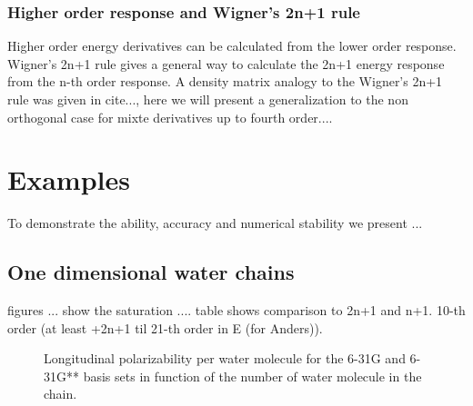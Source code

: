 \documentclass[twocolumn,showpacs,preprintnumbers,amsmath,amssymb]{revtex4}
\begin{document}
\subsubsection{Higher order response and Wigner's 2n+1 rule }
Higher order energy derivatives can be calculated from the lower
order response. Wigner's 2n+1 rule gives a general way to calculate the 2n+1
energy response from the n-th order response. A density matrix analogy to
the Wigner's 2n+1 rule was given in cite{...}, here we will present
a generalization to the non orthogonal case for mixte derivatives 
up to fourth order....
\section{Examples}
To demonstrate the ability, accuracy and numerical stability we present
...
\subsection{One dimensional water chains}
figures ... show the saturation ....
table shows comparison to 2n+1 and n+1.
10-th order (at least +2n+1 til 21-th order in E (for Anders)).



\begin{figure}[t]
  \caption{\protect
    Longitudinal polarizability per water molecule for 
    the 6-31G and 6-31G** basis sets in function
    of the number of water molecule in the chain.
  }\label{fig:Alpha_All}
\end{figure}
\end{document}
